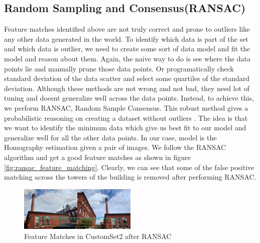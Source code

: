 \documentclass[conference]{IEEEtran}
\begin{document}
\subsection{Random Sampling and Consensus(RANSAC)}
Feature matches identified above are not truly correct and prone to outliers like any other data generated in the world. To identify which data is part of the set and which data is outlier, we need to create some sort of data model and fit the model and reason about them. Again, the naive way to do is see where the data points lie and manually prune those data points. Or programatically check standard deviation of the data scatter and select some quartiles of the standard deviation. Although these methods are not wrong and not bad, they need lot of tuning and doesnt generalize well across the data points. Instead, to achieve this, we perform RANSAC, Random Sample Consensus. This robust method gives a probabilistic reasoning on creating a dataset without outliers \cite{bib:ransac_video}. The idea is that we want to identify the minimum data which give us best fit to our model and generalize well for all the other data points. In our case, model is the Homography estimation given a pair of images. We follow the RANSAC algorithm and get a good feature matches as shown in figure \ref{fig:ransac_feature_matching}. Clearly, we can see that some of the false positive matching across the towers of the building is removed after performing RANSAC.

\begin{figure}[h]
  \centering
  \captionsetup{justification=centering}
  \includegraphics[width=0.5\textwidth]{phase1/customset2_ransac_feature_matches_2_1.png}
  \caption{\label{fig:ransac_feature_matches}Feature Matches in CustomSet2 after RANSAC}
\end{figure}
\end{document}
